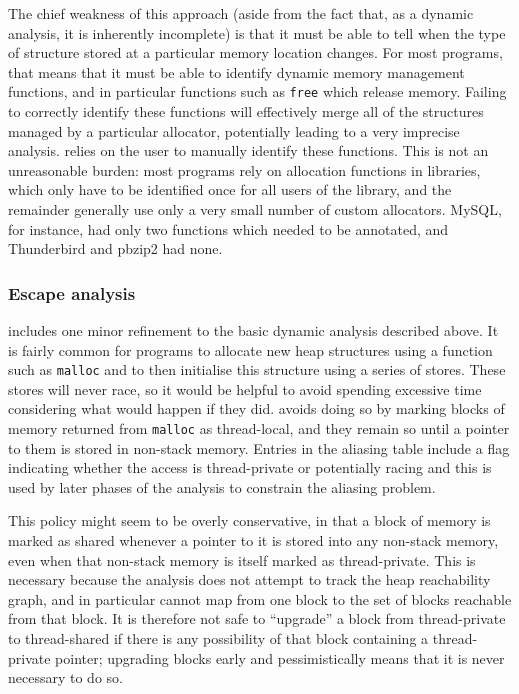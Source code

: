 The chief weakness of this approach (aside from the fact that, as a
dynamic analysis, it is inherently incomplete) is that it must be able
to tell when the type of structure stored at a particular memory
location changes.  For most programs, that means that it must be able
to identify dynamic memory management functions, and in particular
functions such as \texttt{free} which release memory.  Failing to
correctly identify these functions will effectively merge all of the
structures managed by a particular allocator, potentially leading to a
very imprecise analysis.  {\Technique} relies on the user to manually
identify these functions.  This is not an unreasonable burden: most
programs rely on allocation functions in libraries, which only have to
be identified once for all users of the library, and the remainder
generally use only a very small number of custom allocators.  MySQL,
for instance, had only two functions which needed to be annotated, and
Thunderbird and pbzip2 had none.

\subsubsection{Escape analysis}
{\Implementation} includes one minor refinement to the basic dynamic
analysis described above.  It is fairly common for programs to
allocate new heap structures using a function such as \texttt{malloc}
and to then initialise this structure using a series of stores.  These
stores will never race, so it would be helpful to avoid spending
excessive time considering what would happen if they did.
{\Technique} avoids doing so by marking blocks of memory returned from
\texttt{malloc} as thread-local, and they remain so until a pointer to
them is stored in non-stack memory.  Entries in the aliasing table
include a flag indicating whether the access is thread-private or
potentially racing and this is used by later phases of the analysis to
constrain the aliasing problem.

This policy might seem to be overly conservative, in that a block of
memory is marked as shared whenever a pointer to it is stored into any
non-stack memory, even when that non-stack memory is itself marked as
thread-private.  This is necessary because the analysis does not
attempt to track the heap reachability graph, and in particular cannot
map from one block to the set of blocks reachable from that block.  It
is therefore not safe to ``upgrade'' a block from thread-private to
thread-shared if there is any possibility of that block containing a
thread-private pointer; upgrading blocks early and pessimistically
means that it is never necessary to do so.  

